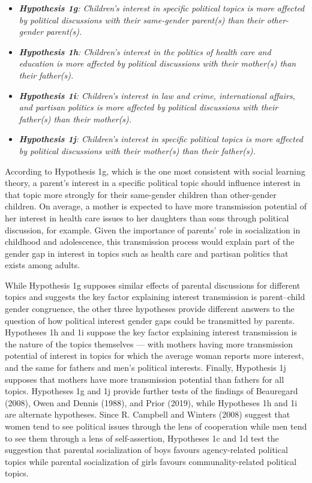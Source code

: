 \documentclass[
  letterpaper,
  DIV=11,
  numbers=noendperiod]{scrreprt}
\begin{document}
\begin{itemize}
\item
  \emph{\textbf{Hypothesis 1g}: Children's interest in specific
  political topics is more affected by political discussions with their
  same-gender parent(s) than their other-gender parent(s).}
\item
  \emph{\textbf{Hypothesis 1h}: Children's interest in the politics of
  health care and education is more affected by political discussions
  with their mother(s) than their father(s).}
\item
  \emph{\textbf{Hypothesis 1i}: Children's interest in law and crime,
  international affairs, and partisan politics is more affected by
  political discussions with their father(s) than their mother(s).}
\item
  \emph{\textbf{Hypothesis 1j}: Children's interest in specific
  political topics is more affected by political discussions with their
  mother(s) than their father(s).}
\end{itemize}

According to Hypothesis 1g, which is the one most consistent with social
learning theory, a parent's interest in a specific political topic
should influence interest in that topic more strongly for their
same-gender children than other-gender children. On average, a mother is
expected to have more transmission potential of her interest in health
care issues to her daughters than sons through political discussion, for
example. Given the importance of parents' role in socialization in
childhood and adolescence, this transmission process would explain part
of the gender gap in interest in topics such as health care and partisan
politics that exists among adults.

While Hypothesis 1g supposes similar effects of parental discussions for
different topics and suggests the key factor explaining interest
transmission is parent--child gender congruence, the other three
hypotheses provide different answers to the question of how political
interest gender gaps could be transmitted by parents. Hypotheses 1h and
1i suppose the key factor explaining interest transmission is the nature
of the topics themselves --- with mothers having more transmission
potential of interest in topics for which the average woman reports more
interest, and the same for fathers and men's political interests.
Finally, Hypothesis 1j supposes that mothers have more transmission
potential than fathers for all topics. Hypotheses 1g and 1j provide
further tests of the findings of Beauregard (2008), Owen and Dennis
(1988), and Prior (2019), while Hypotheses 1h and 1i are alternate
hypotheses. Since R. Campbell and Winters (2008) suggest that women tend
to see political issues through the lens of cooperation while men tend
to see them through a lens of self-assertion, Hypotheses 1c and 1d test
the suggestion that parental socialization of boys favours
agency-related political topics while parental socialization of girls
favours communality-related political topics.
\end{document}
